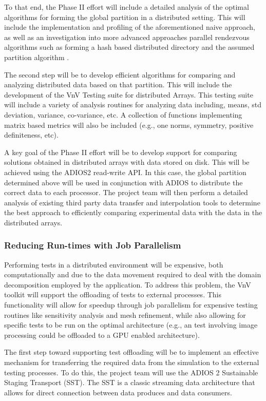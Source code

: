 To that end, the Phase II effort will include a detailed analysis of the optimal algorithms for forming the global partition in a distributed setting. This will include the implementation and profiling of the aforementioned naive approach, as well as an investigation into more advanced approaches parallel rendezvous algorithms such as forming a hash based distributed directory \cite{hypre-nine} and the assumed partition algorithm \cite{hypre-assumed}. 

The second step will be to develop efficient algorithms for comparing and analyzing distributed data based on that partition. This will include the development of the VnV Testing suite for distributed Arrays. This testing suite will include a variety of analysis routines for analyzing data including, means, std deviation, variance, co-variance, etc. A collection of functions implementing matrix based metrics will also be included (e.g., one norms, symmetry, positive definiteness, etc). 

A key goal of the Phase II effort will be to develop support for comparing solutions obtained in distributed arrays with data stored on disk. This will be achieved using the ADIOS2 read-write API. In this case, the global partition determined above will be used in conjunction with ADIOS to distribute the correct data to each processor. The project team will then perform a detailed analysis of existing third party data transfer and interpolation tools to determine the best approach to efficiently comparing experimental data with the data in the distributed arrays. 

\subsubsection{Reducing Run-times with Job Parallelism}

Performing \VV tests in a distributed environment will be expensive, both computationally and due to the data movement required to deal with the domain decomposition employed by the application. To address this problem, the VnV toolkit will support the offloading of tests to external processes. This functionality will allow for speedup through job parallelism for expensive testing routines like sensitivity analysis and mesh refinement, while also allowing for specific tests to be run on the optimal architecture (e.g., an test involving image processing could be offloaded to a GPU enabled architecture).  

The first step toward supporting test offloading will be to implement an effective mechanism for transferring the required 
data from the simulation to the external testing processes. To do this, the project team will use the ADIOS 2 Sustainable Staging Transport (SST). The SST is a classic streaming data architecture that allows for direct connection between data produces and data consumers. 

